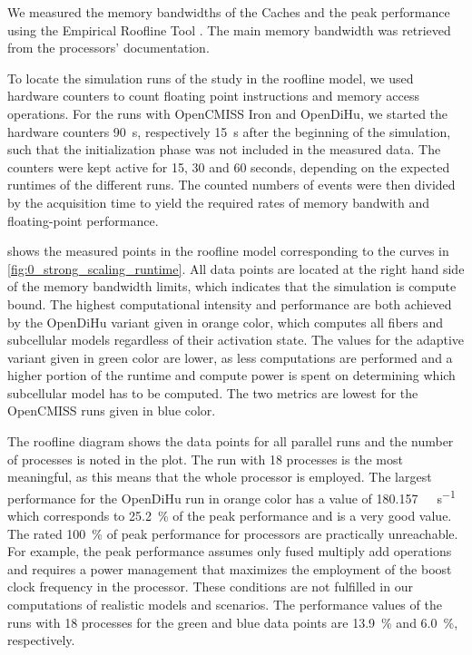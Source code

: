 We measured the memory bandwidths of the Caches and the peak performance using the Empirical Roofline Tool \cite{ert}. The main memory bandwidth was retrieved from the processors' documentation.

To locate the simulation runs of the study in the roofline model, we used hardware counters to count floating point instructions and memory access operations.
For the runs with OpenCMISS Iron and OpenDiHu, we started the hardware counters \SI{90}{\second}, respectively \SI{15}{\second} after the beginning of the simulation, such that the initialization phase was not included in the measured data. The counters were kept active for 15, 30 and 60 seconds, depending on the expected runtimes of the different runs. The counted numbers of events were then divided by the acquisition time to yield the required rates of memory bandwith and floating-point performance.

 shows the measured points in the roofline model corresponding to the curves in \cref{fig:0_strong_scaling_runtime}. All data points are located at the right hand side of the memory bandwidth limits, which indicates that the simulation is compute bound. 
The highest computational intensity and performance are both achieved by the OpenDiHu variant given in orange color, which computes all fibers and subcellular models regardless of their activation state. The values for the adaptive variant given in green color are lower, as less computations are performed and a higher portion of the runtime and compute power is spent on determining which subcellular model has to be computed. The two metrics are lowest for the OpenCMISS runs given in blue color.

The roofline diagram shows the data points for all parallel runs and the number of processes is noted in the plot. The run with 18 processes is the most meaningful, as this means that the whole processor is employed. The largest performance for the OpenDiHu run in orange color has a value of \SI{180.157}{\giga\flop\per\second} which corresponds to \SI{25.2}{\percent} of the peak performance and is a very good value. The rated \SI{100}{\percent} of peak performance for processors are practically unreachable. For example, the peak performance assumes only fused multiply add operations and requires a power management that maximizes the employment of the boost clock frequency in the processor. These conditions are not fulfilled in our computations of realistic models and scenarios.
The performance values of the runs with 18 processes for the green and blue data points are \SI{13.9}{\percent} and \SI{6.0}{\percent}, respectively. 


